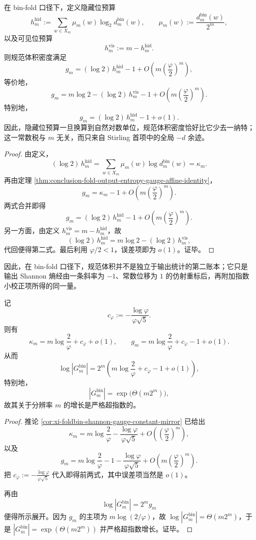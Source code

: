 \begin{theorem}[隐藏位预算的一纳特税律]\label{thm:conclusion-hidden-visible-budget-one-nat-tax}
在 bin-fold 口径下，定义隐藏位预算
\[
h_m^{\mathrm{hid}}
:=
\sum_{w\in X_m}\mu_m(w)\log_2 d_m^{\mathrm{bin}}(w),
\qquad
\mu_m(w):=\frac{d_m^{\mathrm{bin}}(w)}{2^m},
\]
以及可见位预算
\[
h_m^{\mathrm{vis}}:=m-h_m^{\mathrm{hid}}.
\]
则规范体积密度满足
\[
g_m
=
(\log 2)\,h_m^{\mathrm{hid}}-1
+O\!\left(m\left(\frac{\varphi}{2}\right)^m\right),
\]
等价地，
\[
g_m
=
m\log 2-(\log 2)\,h_m^{\mathrm{vis}}-1
+O\!\left(m\left(\frac{\varphi}{2}\right)^m\right).
\]
特别地，
\[
g_m=(\log 2)\,h_m^{\mathrm{hid}}-1+o(1).
\]
因此，隐藏位预算一旦换算到自然对数单位，规范体积密度恰好比它少去一纳特；这一常数税与 \(m\) 无关，而只来自 Stirling 首项中的全局 \(-d\) 余迹。
\end{theorem}
\begin{proof}
由定义，
\[
(\log 2)\,h_m^{\mathrm{hid}}
=
\sum_{w\in X_m}\mu_m(w)\log d_m^{\mathrm{bin}}(w)
=
\kappa_m.
\]
再由定理 \ref{thm:conclusion-fold-output-entropy-gauge-affine-identity}，
\[
g_m=\kappa_m-1+O\!\left(m\left(\frac{\varphi}{2}\right)^m\right).
\]
两式合并即得
\[
g_m=(\log 2)\,h_m^{\mathrm{hid}}-1+O\!\left(m\left(\frac{\varphi}{2}\right)^m\right).
\]
另一方面，由定义 \(h_m^{\mathrm{vis}}=m-h_m^{\mathrm{hid}}\)，故
\[
(\log 2)\,h_m^{\mathrm{hid}}=m\log 2-(\log 2)\,h_m^{\mathrm{vis}},
\]
代回便得第二式。最后利用 \(\varphi/2<1\)，误差项即为 \(o(1)\)。证毕。
\end{proof}

\noindent
因此，在 bin-fold 口径下，规范体积并不是独立于输出统计的第二账本；它只是输出 Shannon 熵经由一条斜率为 \(-1\)、常数位移为 \(1\) 的仿射重标后，再附加指数小校正项所得的同一量。

\begin{corollary}[规范体积的超指数律]\label{cor:conclusion-gauge-volume-superexponential-law}
记
\[
c_\varphi:=-\frac{\log\varphi}{\varphi\sqrt5}.
\]
则有
\[
\kappa_m=m\log\frac{2}{\varphi}+c_\varphi+o(1),
\qquad
g_m=m\log\frac{2}{\varphi}+c_\varphi-1+o(1).
\]
从而
\[
\log |G_m^{\mathrm{bin}}|
=
2^m\left(
m\log\frac{2}{\varphi}+c_\varphi-1+o(1)
\right),
\]
特别地，
\[
|G_m^{\mathrm{bin}}|
=
\exp\!\bigl(\Theta(m2^m)\bigr),
\]
故其关于分辨率 \(m\) 的增长是严格超指数的。
\end{corollary}
\begin{proof}
推论 \ref{cor:xi-foldbin-shannon-gauge-constant-mirror} 已给出
\[
\kappa_m
=
m\log\frac{2}{\varphi}
-\frac{\log\varphi}{\varphi\sqrt5}
+O\!\left(\left(\frac{\varphi}{2}\right)^m\right),
\]
以及
\[
g_m
=
m\log\frac{2}{\varphi}
-1-\frac{\log\varphi}{\varphi\sqrt5}
+O\!\left(m\left(\frac{\varphi}{2}\right)^m\right).
\]
把
\(
c_\varphi:=-\frac{\log\varphi}{\varphi\sqrt5}
\)
代入即得前两式，其中误差项当然是 \(o(1)\)。

再由
\[
\log |G_m^{\mathrm{bin}}|=2^m g_m
\]
便得所示展开。因为 \(g_m\) 的主项为 \(m\log(2/\varphi)\)，故 \(\log |G_m^{\mathrm{bin}}|=\Theta(m2^m)\)，于是
\(
|G_m^{\mathrm{bin}}|=\exp(\Theta(m2^m))
\)
并严格超指数增长。证毕。
\end{proof}

